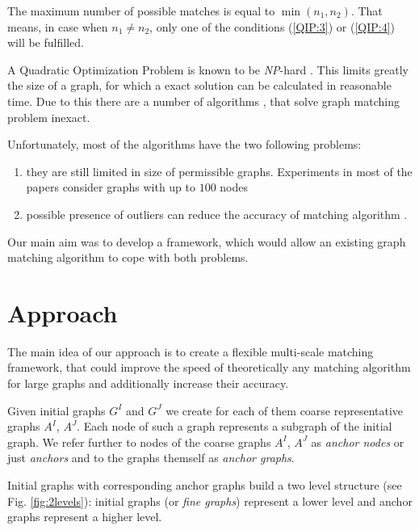 The maximum number of possible matches is equal to $\min(n_1, n_2)$. That means, in case when $n_1\not = n_2$, only one of the conditions (\ref{QIP:3}) or (\ref{QIP:4}) will be fulfilled.

A Quadratic Optimization Problem is known to be \emph{NP}-hard \cite{Sahni1974}. This limits greatly the size of a graph, for which a exact solution can be calculated in reasonable time. Due to this there are a number of algorithms \cite{Cho2014_Haystack, Cho2010_RRWM, Cho2012_ProgressiveGM, Chui2003, Suh_CVPR2015}, that solve graph matching problem inexact.

Unfortunately, most of the algorithms have the two following problems:
\begin{enumerate}
\item they are still limited in size of permissible graphs. Experiments in most of the papers consider graphs with up to $100$ nodes \cite{Cho2014_Haystack, Cho2010_RRWM, Cho2012_ProgressiveGM}
\item possible presence of outliers can reduce the accuracy of matching algorithm \cite{Suh_CVPR2015}.
\end{enumerate}  

Our main aim was to develop a framework, which would allow an existing graph matching algorithm to cope with both problems.


\section{Approach}

The main idea of our approach is to create a flexible multi-scale matching framework, that could improve the speed of
theoretically any matching algorithm for large graphs and additionally increase their accuracy. 

Given initial graphs $G^I$ and $G^J$ we create for each of them coarse representative graphs $A^I$, $A^J$. Each node of such a graph represents a subgraph of the initial graph. We refer further to nodes of the coarse graphs $A^I$, $A^J$ as \emph{anchor nodes} or just \emph{anchors} and to the graphs themself as \emph{anchor graphs}.

Initial graphs with corresponding anchor graphs build a two level structure (see Fig. \ref{fig:2levels}): initial graphs (or \emph{fine graphs}) represent a lower level and anchor graphs represent a higher level.  

